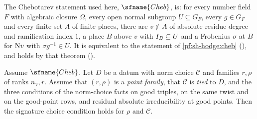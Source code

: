 The Chebotarev statement used here, $\sfname{Cheb}$, is: for every number field $F$ with algebraic closure $\Omega$, every open normal subgroup
$U\subseteq G_F$, every $g\in G_F$ and every finite set $A$ of finite places, there are $v\notin A$ of absolute residue degree and ramification index
$1$, a place $B$ above $v$ with $I_B\subseteq U$ and a Frobenius $\sigma$ at $B$ for $\mathrm{N} v$ with $\sigma g^{-1}\in U$. It is equivalent to
the statement of \cref{pf:sh-hodge:cheb} (), and holds by that theorem
().

\begin{theorem}\label{pf:sh-hodge:js}
Assume $\sfname{Cheb}$. Let $D$ be a datum with norm choice $\mathcal C$ and families $r,\rho$ of ranks $n_V,r$. Assume that $(r,\rho)$ is a
\emph{point family}, that $\mathcal C$ is \emph{tied} to $D$, and the three conditions of the norm-choice facts on good triples, on the same twist and
on the good-point rows, and residual absolute irreducibility at good points. Then the signature choice condition holds for $\rho$ and $\mathcal C$.
\end{theorem}

